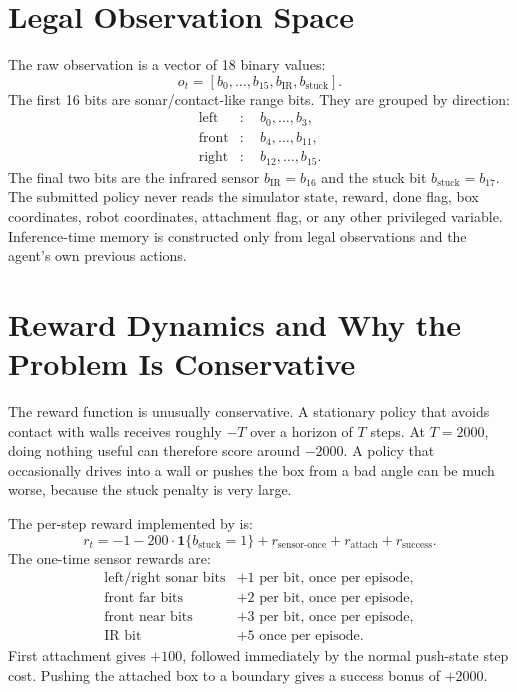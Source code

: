 \documentclass[11pt]{article}
\begin{document}
\section{Legal Observation Space}

The raw observation is a vector of 18 binary values:
\[
  o_t =
  [b_0,\ldots,b_{15}, b_{\text{IR}}, b_{\text{stuck}}].
\]
The first 16 bits are sonar/contact-like range bits.  They are grouped by direction:
\[
\begin{aligned}
  \text{left}  &:\quad b_0,\ldots,b_3,\\
  \text{front} &:\quad b_4,\ldots,b_{11},\\
  \text{right} &:\quad b_{12},\ldots,b_{15}.
\end{aligned}
\]
The final two bits are the infrared sensor \(b_{\text{IR}}=b_{16}\) and the stuck bit
\(b_{\text{stuck}}=b_{17}\).  The submitted policy never reads the simulator state,
reward, done flag, box coordinates, robot coordinates, attachment flag, or any other
privileged variable.  Inference-time memory is constructed only from legal observations
and the agent's own previous actions.

\section{Reward Dynamics and Why the Problem Is Conservative}

The reward function is unusually conservative.  A stationary policy that avoids
contact with walls receives roughly \(-T\) over a horizon of \(T\) steps.  At
\(T=2000\), doing nothing useful can therefore score around \(-2000\).  A policy that
occasionally drives into a wall or pushes the box from a bad angle can be much worse,
because the stuck penalty is very large.

The per-step reward implemented by  is:
\[
  r_t =
  -1
  - 200 \cdot \mathbf{1}\{b_{\text{stuck}}=1\}
  + r_{\text{sensor-once}}
  + r_{\text{attach}}
  + r_{\text{success}}.
\]
The one-time sensor rewards are:
\[
\begin{array}{ll}
\text{left/right sonar bits} & +1 \text{ per bit, once per episode},\\
\text{front far bits}       & +2 \text{ per bit, once per episode},\\
\text{front near bits}      & +3 \text{ per bit, once per episode},\\
\text{IR bit}               & +5 \text{ once per episode}.
\end{array}
\]
First attachment gives \(+100\), followed immediately by the normal push-state step
cost.  Pushing the attached box to a boundary gives a success bonus of \(+2000\).
\end{document}
